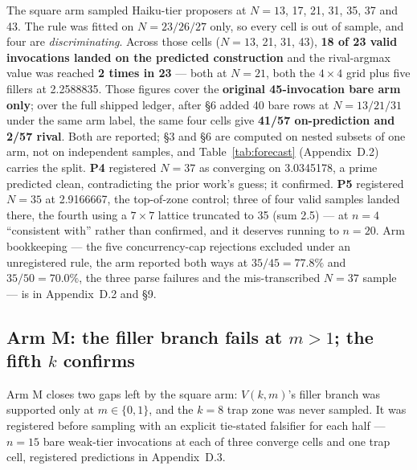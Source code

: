The square arm sampled Haiku-tier proposers at $N = 13$, 17, 21, 31, 35, 37 and 43. The rule was
fitted on $N = 23/26/27$ only, so every cell is out of sample, and four are \emph{discriminating}.
Across those cells ($N = 13$, 21, 31, 43), \textbf{18 of 23 valid invocations landed on the
predicted construction} and the rival-argmax value was reached \textbf{2 times in 23} --- both at
$N = 21$, both the $4 \times 4$ grid plus five fillers at 2.2588835. Those figures cover the
\textbf{original 45-invocation bare arm only}; over the full shipped ledger, after \S6 added 40 bare
rows at $N = 13/21/31$ under the same arm label, the same four cells give \textbf{41/57
on-prediction and 2/57 rival}. Both are reported; \S3 and \S6 are computed on nested subsets of one
arm, not on independent samples, and Table~\ref{tab:forecast} (Appendix~D.2) carries the split.
\textbf{P4} registered $N = 37$ as converging on 3.0345178, a prime predicted clean, contradicting
the prior work's guess; it confirmed. \textbf{P5} registered $N = 35$ at 2.9166667, the top-of-zone
control; three of four valid samples landed there, the fourth using a $7 \times 7$ lattice truncated
to 35 (sum 2.5) --- at $n = 4$ ``consistent with'' rather than confirmed, and it deserves running to
$n = 20$. Arm bookkeeping --- the five concurrency-cap rejections excluded under an unregistered
rule, the arm reported both ways at $35/45 = 77.8\%$ and $35/50 = 70.0\%$, the three parse failures
and the mis-transcribed $N = 37$ sample --- is in Appendix~D.2 and \S9.

\subsection{Arm M: the filler branch fails at $m > 1$; the fifth $k$ confirms}

Arm M closes two gaps left by the square arm: $V(k, m)$'s filler branch was supported only at
$m \in \{0, 1\}$, and the $k = 8$ trap zone was never sampled. It was registered before sampling
with an explicit tie-stated falsifier for each half --- $n = 15$ bare weak-tier invocations at each
of three converge cells and one trap cell, registered predictions in Appendix~D.3.

